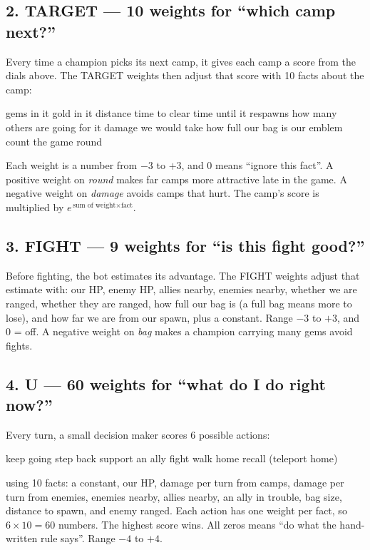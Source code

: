 \documentclass[11pt,a4paper]{article}
\begin{document}
\subsection*{2. TARGET --- 10 weights for ``which camp next?''}
Every time a champion picks its next camp, it gives each camp a score from the dials above. The TARGET
weights then adjust that score with 10 facts about the camp:
\begin{center}
gems in it \textbullet{} gold in it \textbullet{} distance \textbullet{} time to clear \textbullet{} time until it respawns
\textbullet{} how many others are going for it \textbullet{} damage we would take \textbullet{} how full our bag is
\textbullet{} our emblem count \textbullet{} the game round
\end{center}
Each weight is a number from $-3$ to $+3$, and 0 means ``ignore this fact''. A positive weight on
\emph{round} makes far camps more attractive late in the game. A negative weight on \emph{damage}
avoids camps that hurt. The camp's score is multiplied by $e^{\,\text{sum of weight}\times\text{fact}}$.

\subsection*{3. FIGHT --- 9 weights for ``is this fight good?''}
Before fighting, the bot estimates its advantage. The FIGHT weights adjust that estimate with:
our HP, enemy HP, allies nearby, enemies nearby, whether we are ranged, whether they are ranged, how
full our bag is (a full bag means more to lose), and how far we are from our spawn, plus a constant.
Range $-3$ to $+3$, and 0 = off. A negative weight on \emph{bag} makes a champion carrying many gems avoid fights.

\subsection*{4. U --- 60 weights for ``what do I do right now?''}
Every turn, a small decision maker scores 6 possible actions:
\begin{center}
keep going \textbullet{} step back \textbullet{} support an ally \textbullet{} fight \textbullet{} walk home \textbullet{} recall (teleport home)
\end{center}
using 10 facts: a constant, our HP, damage per turn from camps, damage per turn from enemies, enemies
nearby, allies nearby, an ally in trouble, bag size, distance to spawn, and enemy ranged. Each action
has one weight per fact, so $6 \times 10 = 60$ numbers. The highest score wins. All zeros means ``do
what the hand-written rule says''. Range $-4$ to $+4$.
\end{document}
